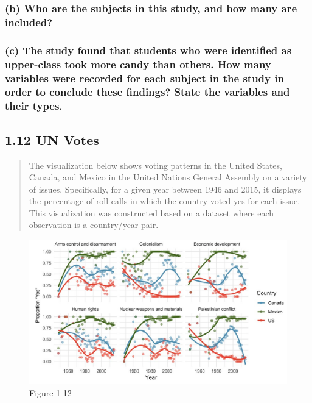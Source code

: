 \documentclass[
]{article}
\begin{document}
\subsubsection{(b) Who are the subjects in this study, and how many are
included?}\label{b-who-are-the-subjects-in-this-study-and-how-many-are-included-1}

\subsubsection{(c) The study found that students who were identified as
upper-class took more candy than others. How many variables were
recorded for each subject in the study in order to conclude these
findings? State the variables and their
types.}\label{c-the-study-found-that-students-who-were-identified-as-upper-class-took-more-candy-than-others.-how-many-variables-were-recorded-for-each-subject-in-the-study-in-order-to-conclude-these-findings-state-the-variables-and-their-types.}

\subsection{1.12 UN Votes}\label{un-votes}

\begin{quote}
The visualization below shows voting patterns in the United States,
Canada, and Mexico in the United Nations General Assembly on a variety
of issues. Specifically, for a given year between 1946 and 2015, it
displays the percentage of roll calls in which the country voted yes for
each issue. This visualization was constructed based on a dataset where
each observation is a country/year pair.
\end{quote}

\begin{figure}
\centering
\includegraphics{./assets/1-12.jpg}
\caption{Figure 1-12}
\end{figure}
\end{document}
